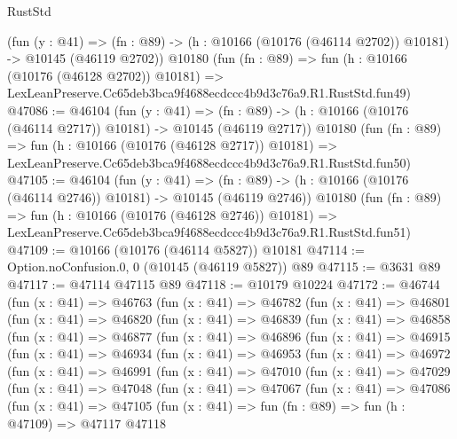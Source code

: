 \begin{lexlean}{RustStd}
\begin{coremodule}
    (fun (y : @41) =>
    (fn : @89) -> (h : @10166 (@10176 (@46114 @2702)) @10181) -> @10145 (@46119 @2702))
    @10180
    (fun (fn : @89) =>
    fun (h : @10166 (@10176 (@46128 @2702)) @10181) =>
    LexLeanPreserve.Cc65deb3bca9f4688ecdccc4b9d3c76a9.R1.RustStd.fun49)
@47086 := @46104
    (fun (y : @41) =>
    (fn : @89) -> (h : @10166 (@10176 (@46114 @2717)) @10181) -> @10145 (@46119 @2717))
    @10180
    (fun (fn : @89) =>
    fun (h : @10166 (@10176 (@46128 @2717)) @10181) =>
    LexLeanPreserve.Cc65deb3bca9f4688ecdccc4b9d3c76a9.R1.RustStd.fun50)
@47105 := @46104
    (fun (y : @41) =>
    (fn : @89) -> (h : @10166 (@10176 (@46114 @2746)) @10181) -> @10145 (@46119 @2746))
    @10180
    (fun (fn : @89) =>
    fun (h : @10166 (@10176 (@46128 @2746)) @10181) =>
    LexLeanPreserve.Cc65deb3bca9f4688ecdccc4b9d3c76a9.R1.RustStd.fun51)
@47109 := @10166 (@10176 (@46114 @5827)) @10181
@47114 := Option.noConfusion.{0, 0} (@10145 (@46119 @5827)) @89
@47115 := @3631 @89
@47117 := @47114 @47115 @89
@47118 := @10179 @10224
@47172 := @46744
    (fun (x : @41) =>
    @46763
      (fun (x : @41) =>
      @46782
        (fun (x : @41) =>
        @46801
          (fun (x : @41) =>
          @46820
            (fun (x : @41) =>
            @46839
              (fun (x : @41) =>
              @46858
                (fun (x : @41) =>
                @46877
                  (fun (x : @41) =>
                  @46896
                    (fun (x : @41) =>
                    @46915
                      (fun (x : @41) =>
                      @46934
                        (fun (x : @41) =>
                        @46953
                          (fun (x : @41) =>
                          @46972
                            (fun (x : @41) =>
                            @46991
                              (fun (x : @41) =>
                              @47010
                                (fun (x : @41) =>
                                @47029
                                  (fun (x : @41) =>
                                  @47048
                                    (fun (x : @41) =>
                                    @47067
                                      (fun (x : @41) =>
                                      @47086
                                        (fun (x : @41) =>
                                        @47105
                                          (fun (x : @41) =>
                                          fun (fn : @89) =>
                                          fun (h : @47109) =>
                                          @47117
                                            @47118

\end{coremodule}
\end{lexlean}
